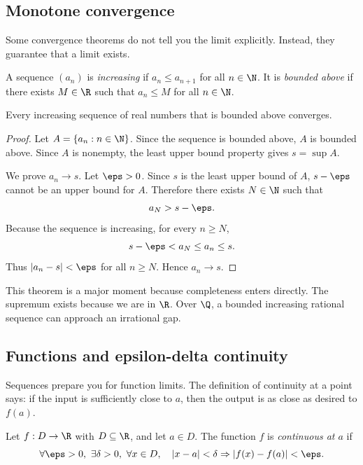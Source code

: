 \subsection{Monotone convergence}

Some convergence theorems do not tell you the limit explicitly. Instead, they
guarantee that a limit exists.

\begin{definition}
A sequence $(a_n)$ is \emph{increasing} if $a_n\leq a_{n+1}$ for all $n\in\N$.
It is \emph{bounded above} if there exists $M\in\R$ such that $a_n\leq M$ for
all $n\in\N$.
\end{definition}

\begin{theorem}
Every increasing sequence of real numbers that is bounded above converges.
\end{theorem}

\begin{proof}
Let $A=\{a_n:n\in\N\}$. Since the sequence is bounded above, $A$ is bounded
above. Since $A$ is nonempty, the least upper bound property gives
$s=\sup A$.

We prove $a_n\to s$. Let $\eps>0$. Since $s$ is the least upper bound of $A$,
$s-\eps$ cannot be an upper bound for $A$. Therefore there exists $N\in\N$ such
that
\[
a_N>s-\eps.
\]
Because the sequence is increasing, for every $n\geq N$,
\[
s-\eps<a_N\leq a_n\leq s.
\]
Thus $|a_n-s|<\eps$ for all $n\geq N$. Hence $a_n\to s$.
\end{proof}

This theorem is a major moment because completeness enters directly. The
supremum exists because we are in $\R$. Over $\Q$, a bounded increasing rational
sequence can approach an irrational gap.

\subsection{Functions and epsilon-delta continuity}

Sequences prepare you for function limits. The definition of continuity at a
point says: if the input is sufficiently close to $a$, then the output is as
close as desired to $f(a)$.

\begin{definition}
Let $f:D\to\R$ with $D\subseteq\R$, and let $a\in D$. The function $f$ is
\emph{continuous at $a$} if
\[
\forall \eps>0,\ \exists \delta>0,\ \forall x\in D,\quad
|x-a|<\delta\Rightarrow |f(x)-f(a)|<\eps.
\]
\end{definition}

